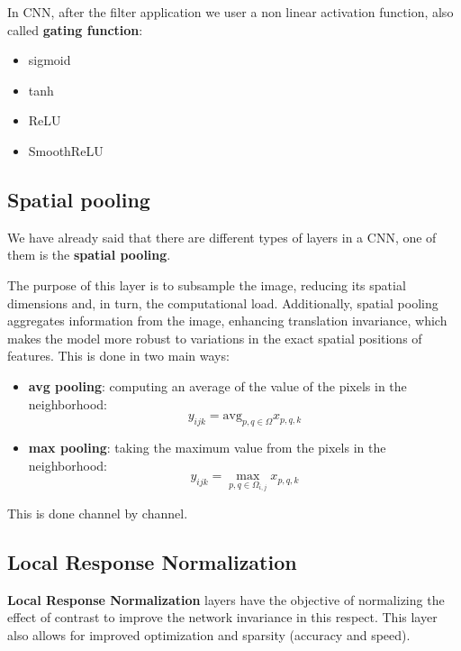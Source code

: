 In CNN, after the filter application we user a non linear activation function,
also called \textbf{gating function}:
\begin{itemize}
    \item sigmoid
    \item tanh
    \item ReLU
    \item SmoothReLU
\end{itemize}

\subsection{Spatial pooling}
We have already said that there are different types of layers in a CNN, one of
them is the \textbf{spatial pooling}.

The purpose of this layer is to subsample the image, reducing its spatial
dimensions and, in turn, the computational load. Additionally, spatial pooling
aggregates information from the image, enhancing translation invariance, which
makes the model more robust to variations in the exact spatial positions of
features. This is done in two main ways:
\begin{itemize}
    \item \textbf{avg pooling}: computing an average of the value of the pixels
          in the neighborhood:
          \begin{equation}
              y_{ijk} =\text{avg}_{p, q \in \Omega} x_{p, q, k}
          \end{equation}
    \item \textbf{max pooling}: taking the maximum value from the pixels in the
          neighborhood:
          \begin{equation}
              y_{ijk} = \max_{p, q \in \Omega_{i, j}} x_{p, q, k}
          \end{equation}
\end{itemize}

This is done channel by channel.
\subsection{Local Response Normalization}
\textbf{Local Response Normalization} layers have the objective of normalizing the
effect of contrast to improve the network invariance in this respect. This layer
also allows for improved optimization and sparsity (accuracy and speed).

